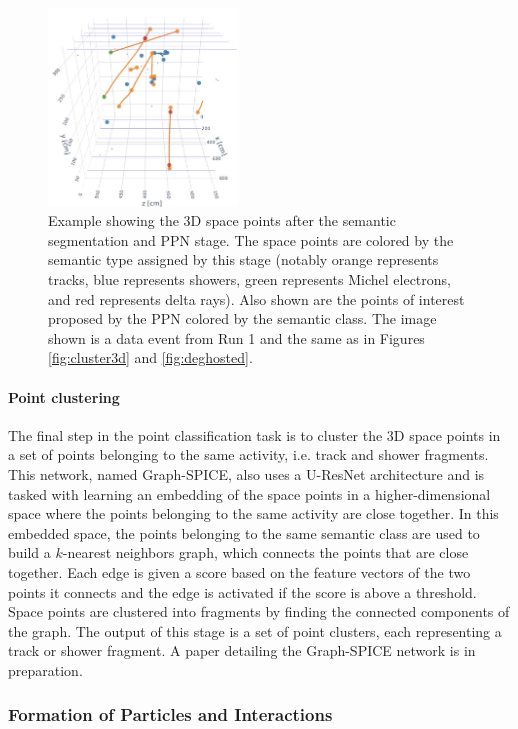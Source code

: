 \begin{figure}
    \centering
    \includegraphics[width=0.45\textwidth]{figures/mlreco/mlreco_points.jpg}
    \caption{Example showing the 3D space points after the semantic segmentation and PPN stage. The space points are colored by the semantic type assigned by this stage (notably orange represents tracks, blue represents showers, green represents Michel electrons, and red represents delta rays). Also shown are the points of interest proposed by the PPN colored by the semantic class. The image shown is a data event from Run 1 and the same as in Figures \ref{fig:cluster3d} and \ref{fig:deghosted}.}
    \label{fig:mlreco_points}
\end{figure}

\paragraph{Point clustering}
The final step in the point classification task is to cluster the 3D space points in a set of points belonging to the same activity, i.e. track and shower fragments. This network, named Graph-SPICE, also uses a U-ResNet architecture and is tasked with learning an embedding of the space points in a higher-dimensional space where the points belonging to the same activity are close together. In this embedded space, the points belonging to the same semantic class are used to build a $k$-nearest neighbors graph, which connects the points that are close together. Each edge is given a score based on the feature vectors of the two points it connects and the edge is activated if the score is above a threshold. Space points are clustered into fragments by finding the connected components of the graph. The output of this stage is a set of point clusters, each representing a track or shower fragment. A paper detailing the Graph-SPICE network is in preparation.

\subsubsection{Formation of Particles and Interactions}
\label{sec:particle_interaction_reconstruction}

